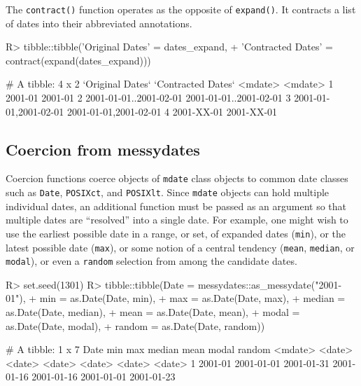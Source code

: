 \documentclass[
]{jss}
\begin{document}
The \texttt{contract()} function operates as the opposite of
\texttt{expand()}. It contracts a list of dates into their abbreviated
annotations.

\begin{CodeChunk}
\begin{CodeInput}
R> tibble::tibble('Original Dates' = dates_expand,
+                'Contracted Dates' = contract(expand(dates_expand)))
\end{CodeInput}
\begin{CodeOutput}
# A tibble: 4 x 2
  `Original Dates`        `Contracted Dates`     
  <mdate>                 <mdate>                
1 2001-01                 2001-01                
2 2001-01-01..2001-02-01  2001-01-01..2001-02-01 
3 {2001-01-01,2001-02-01} {2001-01-01,2001-02-01}
4 2001-XX-01              2001-XX-01             
\end{CodeOutput}
\end{CodeChunk}

\hypertarget{coercion-from-messydates}{%
\subsection{Coercion from messydates}\label{coercion-from-messydates}}

Coercion functions coerce objects of \texttt{mdate} class objects to
common date classes such as \texttt{Date}, \texttt{POSIXct}, and
\texttt{POSIXlt}. Since \texttt{mdate} objects can hold multiple
individual dates, an additional function must be passed as an argument
so that multiple dates are ``resolved'' into a single date. For example,
one might wish to use the earliest possible date in a range, or set, of
expanded dates (\texttt{min}), or the latest possible date
(\texttt{max}), or some notion of a central tendency (\texttt{mean},
\texttt{median}, or \texttt{modal}), or even a \texttt{random} selection
from among the candidate dates.

\begin{CodeChunk}
\begin{CodeInput}
R> set.seed(1301)
R> tibble::tibble(Date = messydates::as_messydate("2001-01"),
+                min = as.Date(Date, min),
+                max = as.Date(Date, max),
+                median = as.Date(Date, median),
+                mean = as.Date(Date, mean),
+                modal = as.Date(Date, modal),
+                random = as.Date(Date, random))
\end{CodeInput}
\begin{CodeOutput}
# A tibble: 1 x 7
  Date    min        max        median     mean       modal      random    
  <mdate> <date>     <date>     <date>     <date>     <date>     <date>    
1 2001-01 2001-01-01 2001-01-31 2001-01-16 2001-01-16 2001-01-01 2001-01-23
\end{CodeOutput}
\end{CodeChunk}
\end{document}
